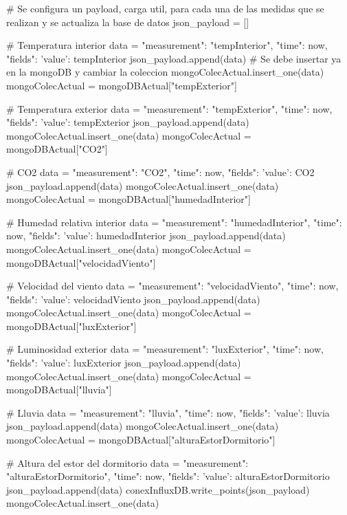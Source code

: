 \begin{python}
    # Se configura un payload, carga util, para cada una de las medidas que se realizan y se actualiza la base de datos
    json_payload = []

    # Temperatura interior
    data = {
        "measurement": "tempInterior",
        "time": now,
        "fields": {
            'value': tempInterior
        }
    }
    json_payload.append(data)
    # Se debe insertar ya en la mongoDB y cambiar la coleccion
    mongoColecActual.insert_one(data)
    mongoColecActual = mongoDBActual["tempExterior"]

    # Temperatura exterior
    data = {
        "measurement": "tempExterior",
        "time": now,
        "fields": {
            'value': tempExterior
        }
    }
    json_payload.append(data)
    mongoColecActual.insert_one(data)
    mongoColecActual = mongoDBActual["CO2"]

    # CO2
    data = {
        "measurement": "CO2",
        "time": now,
        "fields": {
            'value': CO2
        }
    }
    json_payload.append(data)
    mongoColecActual.insert_one(data)
    mongoColecActual = mongoDBActual["humedadInterior"]

    # Humedad relativa interior
    data = {
        "measurement": "humedadInterior",
        "time": now,
        "fields": {
            'value': humedadInterior
        }
    }
    json_payload.append(data)
    mongoColecActual.insert_one(data)
    mongoColecActual = mongoDBActual["velocidadViento"]

    # Velocidad del viento
    data = {
        "measurement": "velocidadViento",
        "time": now,
        "fields": {
            'value': velocidadViento
        }
    }
    json_payload.append(data)
    mongoColecActual.insert_one(data)
    mongoColecActual = mongoDBActual["luxExterior"]

    # Luminosidad exterior
    data = {
        "measurement": "luxExterior",
        "time": now,
        "fields": {
            'value': luxExterior
        }
    }
    json_payload.append(data)
    mongoColecActual.insert_one(data)
    mongoColecActual = mongoDBActual["lluvia"]

    # Lluvia
    data = {
        "measurement": "lluvia",
        "time": now,
        "fields": {
            'value': lluvia
        }
    }
    json_payload.append(data)
    mongoColecActual.insert_one(data)
    mongoColecActual = mongoDBActual["alturaEstorDormitorio"]

    # Altura del estor del dormitorio
    data = {
        "measurement": "alturaEstorDormitorio",
        "time": now,
        "fields": {
            'value': alturaEstorDormitorio
        }
    }
    json_payload.append(data)
    conexInfluxDB.write_points(json_payload)
    mongoColecActual.insert_one(data)


\end{python}

